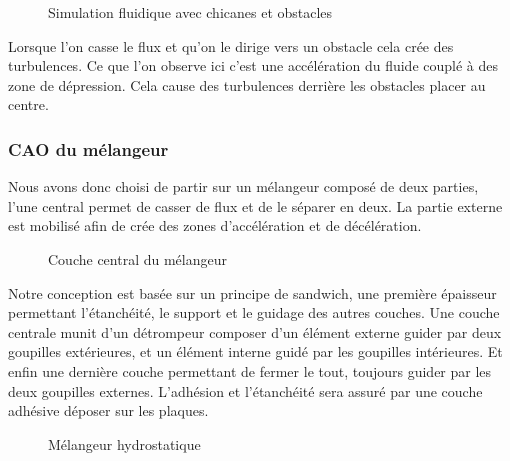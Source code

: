 \documentclass[a4paper, 11pt]{article}
\begin{document}
\begin{figure}[H]
    \centering
    \caption{Simulation fluidique avec chicanes et obstacles}
    \label{fig:simulation5}
\end{figure}
Lorsque l'on casse le flux et qu'on le dirige vers un obstacle cela crée des turbulences.
Ce que l'on observe ici c'est une accélération du fluide couplé à des zone de dépression.
Cela cause des turbulences derrière les obstacles placer au centre.
\subsubsection{CAO du mélangeur}
Nous avons donc choisi de partir sur un mélangeur composé de deux parties, l'une central 
permet de casser de flux et de le séparer en deux.
La partie externe est mobilisé afin de crée des zones d'accélération et de décélération.
\begin{figure}[H]
    \centering
    \caption{Couche central du mélangeur}
    \label{fig:CAO_melangeur_couche2}
\end{figure}
Notre conception est basée sur un principe de sandwich, une première épaisseur permettant l'étanchéité, le support et le guidage des autres couches.
Une couche centrale munit d'un détrompeur composer d'un élément externe guider par deux goupilles extérieures, et un élément interne guidé par les goupilles intérieures.
Et enfin une dernière couche permettant de fermer le tout, toujours guider par les deux goupilles externes.
L'adhésion et l'étanchéité sera assuré par une couche adhésive déposer sur les plaques.
\begin{figure}[H]
    \centering
    \caption{Mélangeur hydrostatique}
    \label{fig:CAO_melangeur}
\end{figure}
\end{document}
